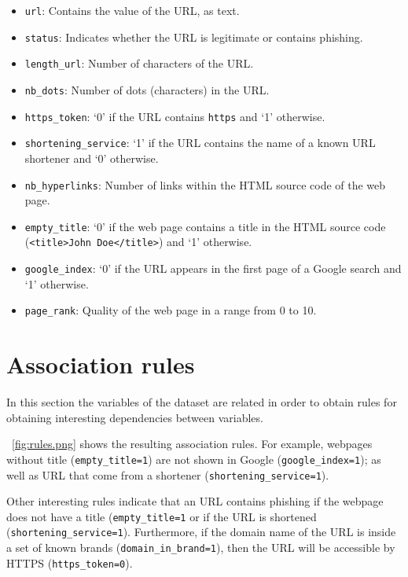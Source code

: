 \documentclass[12pt, a4paper]{article}
\newcommand*{\figref}[1]{\figurename~\ref{fig:#1}}
\begin{document}
      \begin{itemize}
        \item \texttt{url}: Contains the value of the URL, as text.
        \item \texttt{status}: Indicates whether the URL is legitimate or contains phishing.
        \item \texttt{length\_url}: Number of characters of the URL.
        \item \texttt{nb\_dots}: Number of dots (characters) in the URL.
        \item \texttt{https\_token}: `0' if the URL contains \texttt{https} and `1' otherwise.
        \item \texttt{shortening\_service}: `1' if the URL contains the name of a known URL shortener and `0' otherwise.
        \item \texttt{nb\_hyperlinks}: Number of links within the HTML source code of the web page.
        \item \texttt{empty\_title}: `0' if the web page contains a title in the HTML source code (\texttt{<title>John Doe</title>}) and `1' otherwise.
        \item \texttt{google\_index}: `0' if the URL appears in the first page of a Google search and `1' otherwise.
        \item \texttt{page\_rank}: Quality of the web page in a range from 0 to 10.
      \end{itemize}

  \section{Association rules}

    In this section the variables of the dataset are related in order to obtain rules for obtaining interesting dependencies between variables.

    \figref{rules.png} shows the resulting association rules. For example, webpages without title (\texttt{empty\_title=1}) are not shown in Google (\texttt{google\_index=1}); as well as URL that come from a shortener (\texttt{shortening\_service=1}).

    Other interesting rules indicate that an URL contains phishing if the webpage does not have a title (\texttt{empty\_title=1} or if the URL is shortened (\texttt{shortening\_service=1}). Furthermore, if the domain name of the URL is inside a set of known brands (\texttt{domain\_in\_brand=1}), then the URL will be accessible by HTTPS (\texttt{https\_token=0}).
\end{document}
